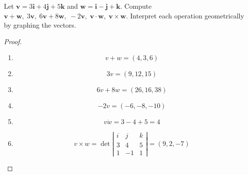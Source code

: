 \documentclass[openany]{book}
\begin{document}
\begin{prob}[1]
    Let \( \mathbf{v} = 3\mathbf{i} + 4\mathbf{j} + 5\mathbf{k} \) and \( \mathbf{w} = \mathbf{i} - \mathbf{j} + \mathbf{k} \). Compute  
    \( \mathbf{v} + \mathbf{w},\; 3\mathbf{v},\; 6\mathbf{v} + 8\mathbf{w},\; -2\mathbf{v},\; \mathbf{v} \cdot \mathbf{w},\; \mathbf{v} \times \mathbf{w} \).  
    Interpret each operation geometrically by graphing the vectors.
\end{prob}
\begin{proof}
    \begin{enumerate}
        \item \begin{equation*}
            v+w=(4, 3, 6)
        \end{equation*}
        \item \begin{equation*}
            3v=(9, 12, 15)
        \end{equation*}
        \item \begin{equation*}
            6v+8w=(26, 16, 38)
        \end{equation*}
        \item \begin{equation*}
            -2v=(-6, -8, -10)
        \end{equation*}
        \item \begin{equation*}
            v\dot w=3-4+5=4
        \end{equation*}
        \item \begin{equation*}
            v\times w=\det\left|\begin{matrix}
                i&j&k\\
                3&4&5\\
                1&-1&1
            \end{matrix}\right|=(9, 2, -7)
        \end{equation*}
    \end{enumerate}
\end{proof}
\end{document}
